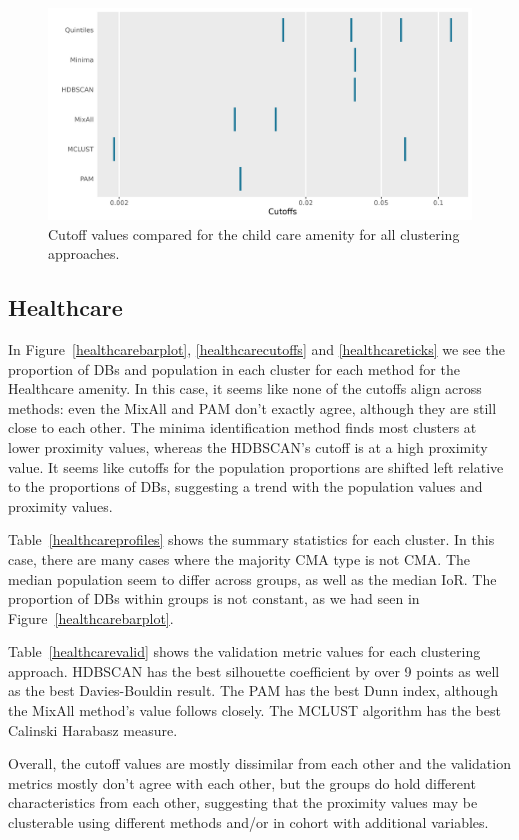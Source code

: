 \documentclass[11pt, a4paper]{article}
\begin{document}
\begin{figure}[H]
\centering
\includegraphics[width=\textwidth]{./cutoff_ticks/Child care_ticks.png}
\caption[Child care cutoff comparison]{Cutoff values compared for the child care amenity for all clustering approaches.}\label{childcareticks}
\end{figure}






\justifying
\subsection{Healthcare}



In Figure~\ref{healthcarebarplot}, \ref{healthcarecutoffs} and \ref{healthcareticks} we see the proportion of DBs and population in each cluster for each method for the Healthcare amenity. In this case, it seems like none of the cutoffs align across methods: even the MixAll and PAM don't exactly agree, although they are still close to each other. The minima identification method finds most clusters at lower proximity values, whereas the HDBSCAN's cutoff is at a high proximity value. It seems like cutoffs for the population proportions are shifted left relative to the proportions of DBs, suggesting a trend with the population values and proximity values.
\par
Table~\ref{healthcareprofiles} shows the summary statistics for each cluster. In this case, there are many cases where the majority CMA type is not CMA. The median population seem to differ across groups, as well as the median IoR. The proportion of DBs within groups is not constant, as we had seen in Figure~\ref{healthcarebarplot}.
\par
Table~\ref{healthcarevalid} shows the validation metric values for each clustering approach. HDBSCAN has the best silhouette coefficient by over 9 points as well as the best Davies-Bouldin result. The PAM has the best Dunn index, although the MixAll method's value follows closely. The MCLUST algorithm has the best Calinski Harabasz measure.
\par
Overall, the cutoff values are mostly dissimilar from each other and the validation metrics mostly don't agree with each other, but the groups do hold different characteristics from each other, suggesting that the proximity values may be clusterable using different methods and/or in cohort with additional variables.
\end{document}
